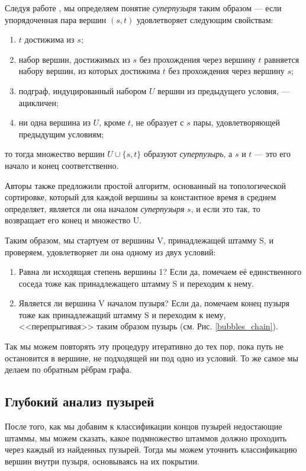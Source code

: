 \documentclass{spbau-diploma}
\begin{document}
Следуя работе \cite{superbubbles}, мы определяем понятие \textit{суперпузыря} таким образом --- если упорядоченная пара вершин $(s,t)$ удовлетворяет следующим свойствам:
\begin{enumerate}
    \item $t$ достижима из $s$;
    \item набор вершин, достижимых из $s$ без прохождения через вершину $t$ равняется набору вершин, из которых достижима $t$ без прохождения через вершину $s$;
    \item подграф, индуцированный набором $U$ вершин из предыдущего условия, --- ацикличен;
    \item ни одна вершина из $U$, кроме $t$, не образует с $s$ пары, удовлетворяющей предыдущим условиям;  
\end{enumerate}
то тогда множество вершин $U \cup \{s,t\}$ образуют \textit{суперпузырь}, а $s$ и $t$ --- это его начало и конец соответственно.

Авторы \cite{superbubbles} также предложили простой алгоритм, основанный на топологической сортировке, который для каждой вершины за константное время в среднем определяет, является ли она началом \textit{суперпузыря} $s$, и если это так, то возвращает его конец и множество U.

Таким образом, мы стартуем от вершины V, принадлежащей штамму S, и проверяем, удовлетворяет ли она одному из двух условий:
\begin{enumerate}
    \item Равна ли исходящая степень вершины 1? Если да, помечаем её единственного соседа тоже как принадлежащего штамму S и переходим к нему.
    \item Является ли вершина V началом пузыря? Если да, помечаем конец пузыря тоже как принадлежащий штамму S и переходим к нему, <<перепрыгивая>> таким образом пузырь (см. Рис. \ref{bubbles_chain}). 
\end{enumerate}
Так мы можем повторять эту процедуру итеративно до тех пор, пока путь не остановится в вершине, не подходящей ни под одно из условий. То же самое мы делаем по обратным рёбрам графа.

\subsection{Глубокий анализ пузырей}

После того, как мы добавим к классификации концов пузырей недостающие штаммы, мы можем сказать, какое подмножество штаммов должно проходить через каждый из найденных пузырей. Тогда мы можем уточнить классификацию вершин внутри пузыря, основываясь на их покрытии.
\end{document}
